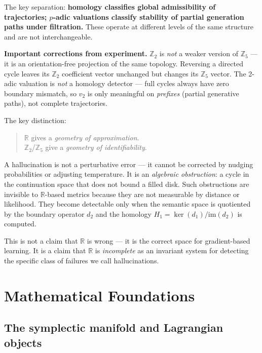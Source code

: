 \documentclass[11pt,a4paper]{article}
\begin{document}
\noindent
The key separation: \textbf{homology classifies global admissibility
of trajectories; $p$-adic valuations classify stability of partial
generation paths under filtration.}
These operate at different levels of the same structure and are not
interchangeable.

\medskip
\noindent
\textbf{Important corrections from experiment.}
$\mathbb{Z}_2$ is \emph{not} a weaker version of $\mathbb{Z}_5$ ---
it is an orientation-free projection of the same topology.
Reversing a directed cycle leaves its $\mathbb{Z}_2$ coefficient
vector unchanged but changes its $\mathbb{Z}_5$ vector.
The 2-adic valuation is \emph{not} a homology detector --- full cycles
always have zero boundary mismatch, so $v_2$ is only meaningful
on \emph{prefixes} (partial generative paths), not complete trajectories.

The key distinction:
\begin{quote}
$\mathbb{R}$ gives a \emph{geometry of approximation}.\\
$\mathbb{Z}_2$/$\mathbb{Z}_5$ give a \emph{geometry of identifiability}.
\end{quote}

A hallucination is not a perturbative error --- it cannot be corrected
by nudging probabilities or adjusting temperature.
It is an \emph{algebraic obstruction}: a cycle in the continuation space
that does not bound a filled disk.
Such obstructions are invisible to $\mathbb{R}$-based metrics because they
are not measurable by distance or likelihood.
They become detectable only when the semantic space is quotiented by the
boundary operator $d_2$ and the homology $H_1 = \ker(d_1)/\mathrm{im}(d_2)$
is computed.

This is not a claim that $\mathbb{R}$ is wrong --- it is the correct space
for gradient-based learning.
It is a claim that $\mathbb{R}$ is \emph{incomplete} as an invariant system
for detecting the specific class of failures we call hallucinations.

\section{Mathematical Foundations}

\subsection{The symplectic manifold and Lagrangian objects}
\end{document}
